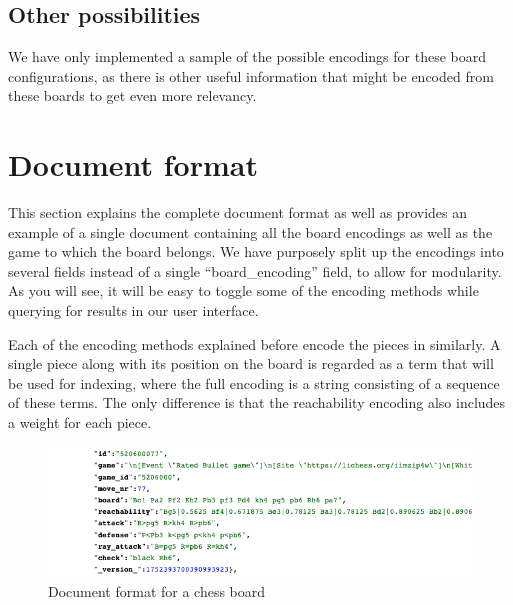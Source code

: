 \documentclass[11pt]{article}
\begin{document}
    \subsection{Other possibilities}

    We have only implemented a sample of the possible encodings for these board configurations, as there is other useful information that might be encoded from these boards to get even more relevancy.



    \section{Document format}\label{sec:documentformat}


    This section explains the complete document format as well as provides an example of a single document containing all the board encodings as well as the game to which the board belongs. We have purposely split up the encodings into several fields instead of a single ``board\_encoding'' field, to allow for modularity. As you will see, it will be easy to toggle some of the encoding methods while querying for results in our user interface.

    Each of the encoding methods explained before encode the pieces in similarly. A single piece along with its position on the board is regarded as a term that will be used for indexing, where the full encoding is a string consisting of a sequence of these terms. The only difference is that the reachability encoding also includes a weight for each piece.

    \begin{figure}[H]
        \centering
        \includegraphics[width=16cm]{images/DocumentFormat}
        \caption{Document format for a chess board}
        \label{fig:DocumentFormat}
    \end{figure}
\end{document}
